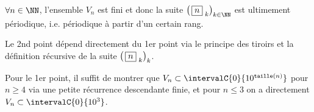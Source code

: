 \bigskip

\begin{fact}
	$\forall n \in \NN$, l'ensemble $V_n$ est fini et donc la suite $\left( \, \sqseq{n}{k} \right)_{k \in \NN}$ est ultimement périodique, i.e. périodique à partir d'un certain rang.
\end{fact}

\begin{proof*}
	Le 2nd point dépend directement du 1er point via le principe des tiroirs et la définition récursive de la suite $\left( \, \fbox{$n$}_{\,\,k} \right)_k$.
	
	\medskip
	
	Pour le 1er point, il suffit de montrer que $V_n \subset \intervalC{0}{10^{\taille(n)}}$ pour $n \geqslant 4$ via une petite récurrence descendante finie, et pour $n \leqslant 3$ on a directement $V_n \subset \intervalC{0}{10^3}$.
\end{proof*}